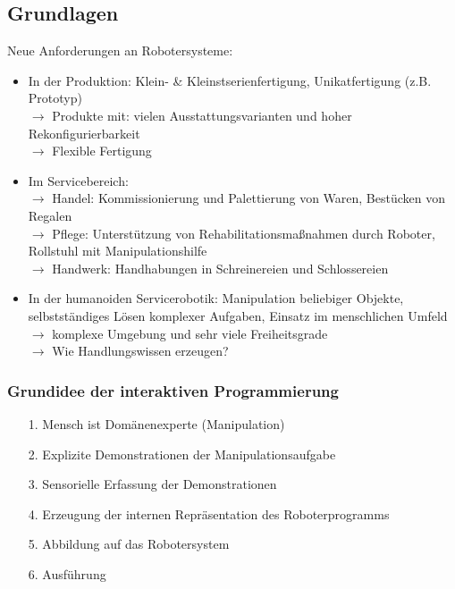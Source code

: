 \subsection{Grundlagen}
Neue Anforderungen an Robotersysteme:
\begin{itemize}
\item In der Produktion: Klein- \& Kleinstserienfertigung, Unikatfertigung (z.B. Prototyp)\\
$\rightarrow$ Produkte mit: vielen Ausstattungsvarianten und hoher Rekonfigurierbarkeit\\
$\rightarrow$ Flexible Fertigung
\item Im Servicebereich: \\
$\rightarrow$ Handel:  Kommissionierung und Palettierung von Waren, Bestücken von Regalen\\
$\rightarrow$ Pflege: Unterstützung von Rehabilitationsmaßnahmen durch Roboter, Rollstuhl mit Manipulationshilfe\\
$\rightarrow$ Handwerk: Handhabungen in Schreinereien und Schlossereien
\item In der humanoiden Servicerobotik: Manipulation beliebiger Objekte, selbstständiges Lösen komplexer Aufgaben, Einsatz im menschlichen Umfeld
$\rightarrow$ komplexe Umgebung und sehr viele Freiheitsgrade\\
$\rightarrow$ Wie Handlungswissen erzeugen?
\end{itemize}

\subsubsection*{Grundidee der interaktiven Programmierung} %
\begin{itemize}
\item[1.]Mensch ist Domänenexperte (Manipulation)
\item[2.]Explizite Demonstrationen der Manipulationsaufgabe
\item[3.]Sensorielle Erfassung der Demonstrationen
\item[4.]Erzeugung der internen Repräsentation des Roboterprogramms
\item[5.]Abbildung auf das Robotersystem
\item[6.]Ausführung
\end{itemize}

